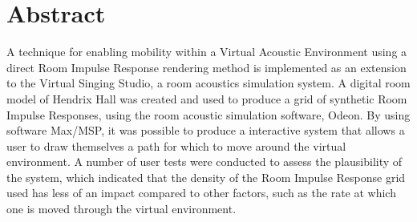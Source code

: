 \documentclass[../../main.tex]{subfiles}
\begin{document}
\clearpage
\thispagestyle{empty}
	
	\section*{Abstract}

		 \vspace{5cm}
		 \begin{center}
		 \begin{minipage}{0.7\textwidth}


		 A technique for enabling mobility within a Virtual Acoustic Environment using a direct Room Impulse Response rendering method is implemented as an extension to the Virtual Singing Studio, a room acoustics simulation system. A digital room model of Hendrix Hall was created and used to produce a grid of synthetic Room Impulse Responses, using the room acoustic simulation software, Odeon. By using software Max/MSP, it was possible to produce a interactive system that allows a user to draw themselves a path for which to move around the virtual environment. A number of user tests were conducted to assess the plausibility of the system, which indicated that the density of the Room Impulse Response grid used has less of an impact compared to other factors, such as the rate at which one is moved through the virtual environment.



\end{minipage}
\end{center}
\end{document}
